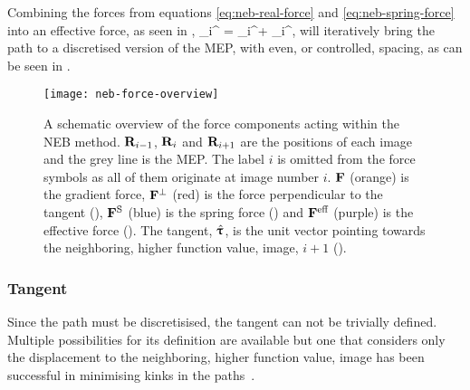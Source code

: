 Combining the forces from equations \ref{eq:neb-real-force} and \ref{eq:neb-spring-force} into an effective force, as seen in ,
\vF_i^ = \vF_i^\perp + \vF_i^,
\eeq
will iteratively bring the path to a discretised version of the MEP, with even, or controlled, spacing, as can be seen in .

\begin{figure}[h]
\begin{center}
\texttt{[image: neb-force-overview]}
\parbox{0.85\linewidth}{\caption{A schematic overview of the force components acting within the NEB method.
${\mathrm{\mathbf{\bm{R}}}}_{i-1}$, ${\mathrm{\mathbf{\bm{R}}}}_i$ and ${\mathrm{\mathbf{\bm{R}}}}_{i+1}$ are the positions of each image and the grey line is the MEP.
The label $i$ is omitted from the force symbols as all of them originate at image number $i$.
${\mathrm{\mathbf{\bm{F}}}}$ (orange) is the gradient force,
${\mathrm{\mathbf{\bm{F}}}}^\perp$ (red) is the force perpendicular to the tangent (),
${\mathrm{\mathbf{\bm{F}}}}^\text{S}$ (blue) is the spring force () and
${\mathrm{\mathbf{\bm{F}}}}^\text{eff}$ (purple) is the effective force ().
The tangent, $\hat{{\mathrm{\mathbf{\bm{\uptau}}}}}$, is the unit vector pointing towards the neighboring, higher function value, image, $i+1$ ().
}
\label{fig:neb-force-overview}
}
\end{center}
\end{figure}

\subsubsection{Tangent}
Since the path must be discretisised, the tangent can not be trivially defined.
Multiple possibilities for its definition are available but one that considers only the displacement to the neighboring, higher function value, image has been successful in minimising kinks in the paths~\cite{neb-tangent-2000}.

